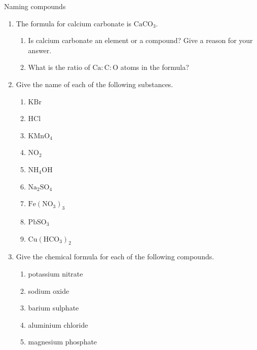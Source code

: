   \label{m38708*secfhsst!!!underscore!!!id255}
            \begin{exercises}{Naming compounds}
{            \nopagebreak
      \label{m38708*id65118}\begin{enumerate}[noitemsep, label=\textbf{\arabic*}. ] 
            \label{m38708*uid47}\item The formula for calcium carbonate is $\mathrm{CaCO}{}_{3}$.
\label{m38708*id65148}\begin{enumerate}[noitemsep, label=\textbf{\alph*}. ] 
            \label{m38708*uid48}\item Is calcium carbonate an element or a compound? Give a reason for your answer.
\label{m38708*uid49}\item What is the ratio of $\mathrm{Ca}:\mathrm{C}:\mathrm{O}$ atoms in the formula?
\end{enumerate}
\label{m38708*uid50}\item Give the name of each of the following substances.
\label{m38708*id65189}\begin{enumerate}[noitemsep, label=\textbf{\alph*}. ] 
            \label{m38708*uid51}\item $\mathrm{KBr}$
\label{m38708*uid52}\item $\mathrm{HCl}$
\label{m38708*uid53}\item ${\mathrm{KMnO}}_{4}$\label{m38708*uid54}\item ${\mathrm{NO}}_{2}$\label{m38708*uid55}\item ${\mathrm{NH}}_{4}\mathrm{OH}$
\label{m38708*uid56}\item ${\mathrm{Na}}_{2}{\mathrm{SO}}_{4}$
\item ${\mathrm{Fe}}({\mathrm{NO}}_{3})_3$
\item ${\mathrm{Pb}}{\mathrm{SO}}_{3}$
\item ${\mathrm{Cu}}({\mathrm{HCO}}_{3})_2$
\end{enumerate}
\label{m38708*uid57}\item Give the chemical formula for each of the following compounds.
\label{m38708*id65338}\begin{enumerate}[noitemsep, label=\textbf{\alph*}. ] 
            \label{m38708*uid58}\item potassium nitrate
\label{m38708*uid59}\item sodium oxide
\label{m38708*uid60}\item barium sulphate
\label{m38708*uid61}\item aluminium chloride
\label{m38708*uid62}\item magnesium phosphate

\end{enumerate}
\end{enumerate}}
\end{exercises}
